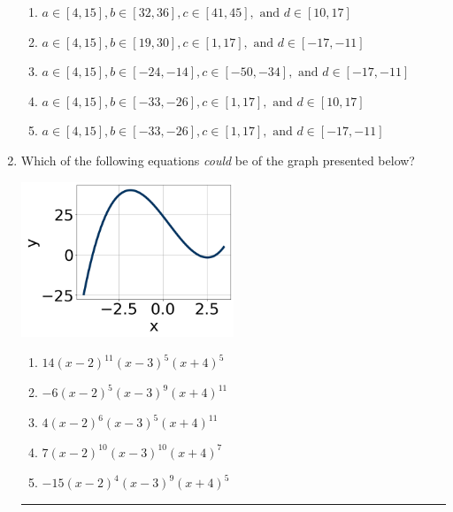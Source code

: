 \documentclass[14pt]{extbook}
\newcommand{\litem}[1]{\item#1\hspace*{-1cm}\rule{\textwidth}{0.4pt}}
\begin{document}
\begin{enumerate}
{\begin{enumerate}[label=\Alph*.]
\item \( a \in [4, 15], b \in [32, 36], c \in [41, 45], \text{ and } d \in [10, 17] \)
\item \( a \in [4, 15], b \in [19, 30], c \in [1, 17], \text{ and } d \in [-17, -11] \)
\item \( a \in [4, 15], b \in [-24, -14], c \in [-50, -34], \text{ and } d \in [-17, -11] \)
\item \( a \in [4, 15], b \in [-33, -26], c \in [1, 17], \text{ and } d \in [10, 17] \)
\item \( a \in [4, 15], b \in [-33, -26], c \in [1, 17], \text{ and } d \in [-17, -11] \)

\end{enumerate} }
\litem{
Which of the following equations \textit{could} be of the graph presented below?
\begin{center}
    \includegraphics[width=0.5\textwidth]{../Figures/polyGraphToFunctionCopyA.png}
\end{center}
\begin{enumerate}[label=\Alph*.]
\item \( 14(x - 2)^{11} (x - 3)^{5} (x + 4)^{5} \)
\item \( -6(x - 2)^{5} (x - 3)^{9} (x + 4)^{11} \)
\item \( 4(x - 2)^{6} (x - 3)^{5} (x + 4)^{11} \)
\item \( 7(x - 2)^{10} (x - 3)^{10} (x + 4)^{7} \)
\item \( -15(x - 2)^{4} (x - 3)^{9} (x + 4)^{5} \)


\end{enumerate}}
\end{enumerate}
\end{document}
